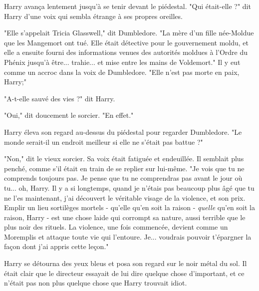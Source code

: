 Harry avança lentement jusqu'à se tenir devant le piédestal. "Qui était-elle ?" dit Harry d'une voix qui sembla étrange à ses propres oreilles.

"Elle s'appelait Tricia Glasswell," dit Dumbledore. "La mère d'un fille née-Moldue que les Mangemort ont tué. Elle était détective pour le gouvernement moldu, et elle a ensuite fourni des informations venues des autorités moldues à l'Ordre du Phénix jusqu'à être... trahie... et mise entre les mains de Voldemort." Il y eut comme un accroc dans la voix de Dumbledore. "Elle n'est pas morte en paix, Harry;"

"A-t-elle sauvé des vies ?" dit Harry.

"Oui," dit doucement le sorcier. "En effet."

Harry éleva son regard au-dessus du piédestal pour regarder Dumbledore. "Le monde serait-il un endroit meilleur si elle ne s'était pas battue ?"

"Non," dit le vieux sorcier. Sa voix était fatiguée et endeuillée. Il semblait plus penché, comme s'il était en train de se replier sur lui-même. "Je vois que tu ne comprends toujours pas. Je pense que tu ne comprendras pas avant le jour où tu... oh, Harry. Il y a si longtemps, quand je n'étais pas beaucoup plus âgé que tu ne l'es maintenant, j'ai découvert le véritable visage de la violence, et son prix. Emplir un lieu sortilèges mortels - qu'elle qu'en soit la raison - \emph{quelle}  qu'en soit la raison, Harry - est une chose laide qui corrompt sa nature, aussi terrible que le plus noir des rituels. La violence, une fois commencée, devient comme un Moremplis et attaque toute vie qui l'entoure. Je... voudrais pouvoir t'épargner la façon dont j'ai appris cette leçon."

Harry se détourna des yeux bleus et posa son regard sur le noir métal du sol. Il était clair que le directeur essayait de lui dire quelque chose d'important, et ce n'était pas non plus quelque chose que Harry trouvait idiot.

